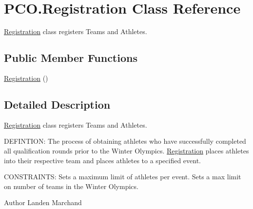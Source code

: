 \hypertarget{classPCO_1_1Registration}{\section{P\+C\+O.\+Registration Class Reference}
\label{classPCO_1_1Registration}
}


\hyperlink{classPCO_1_1Registration}{Registration} class registers Teams and Athletes.  


\subsection*{Public Member Functions}
\begin{DoxyCompactItemize}
\item 
\hyperlink{classPCO_1_1Registration_a74519be4876c47630ca2b5f5084d48eb}{Registration} ()
\end{DoxyCompactItemize}


\subsection{Detailed Description}
\hyperlink{classPCO_1_1Registration}{Registration} class registers Teams and Athletes. 

D\+E\+F\+I\+N\+T\+I\+O\+N\+: The process of obtaining athletes who have successfully completed all qualification rounds prior to the Winter Olympics. \hyperlink{classPCO_1_1Registration}{Registration} places athletes into their respective team and places athletes to a specified event.

C\+O\+N\+S\+T\+R\+A\+I\+N\+T\+S\+: Sets a maximum limit of athletes per event. Sets a max limit on number of teams in the Winter Olympics.\begin{DoxyAuthor}{Author}
Landen Marchand 
\end{DoxyAuthor}


